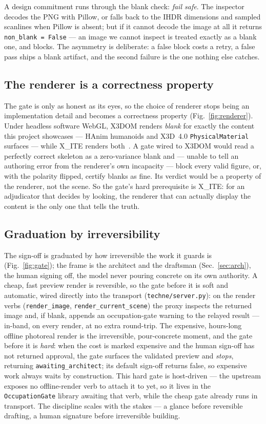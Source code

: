 \documentclass[sigconf,nonacm,screen,anonymous]{acmart}
\begin{document}
A design commitment runs through the blank check: \emph{fail safe}. The inspector decodes the PNG with Pillow, or falls back to the IHDR dimensions and sampled scanlines when Pillow is absent; but if it cannot decode the image at all it returns \texttt{non\_blank = False} --- an image we cannot inspect is treated exactly as a blank one, and blocks. The asymmetry is deliberate: a false block costs a retry, a false pass ships a blank artifact, and the second failure is the one nothing else catches.

\subsection{The renderer is a correctness property}

The gate is only as honest as its eyes, so the choice of renderer stops being an implementation detail and becomes a correctness property (Fig.~\ref{fig:renderer}). Under headless software WebGL, X3DOM renders \emph{blank} for exactly the content this project showcases --- HAnim humanoids and X3D~4.0 \texttt{PhysicalMaterial} surfaces --- while X\_ITE renders both~\cite{xite,x3dom,gltf,playwright}. A gate wired to X3DOM would read a perfectly correct skeleton as a zero-variance blank and --- unable to tell an authoring error from the renderer's own incapacity --- block every valid figure, or, with the polarity flipped, certify blanks as fine. Its verdict would be a property of the renderer, not the scene. So the gate's hard prerequisite is X\_ITE: for an adjudicator that decides by looking, the renderer that can actually display the content is the only one that tells the truth.

\subsection{Graduation by irreversibility}

The sign-off is graduated by how irreversible the work it guards is (Fig.~\ref{fig:gate}); the frame is the architect and the draftsman (Sec.~\ref{sec:arch}), the human signing off, the model never pouring concrete on its own authority. A cheap, fast preview render is reversible, so the gate before it is soft and automatic, wired directly into the transport (\texttt{techne/server.py}): on the render verbs (\texttt{render\_image}, \texttt{render\_current\_scene}) the proxy inspects the returned image and, if blank, appends an occupation-gate warning to the relayed result --- in-band, on every render, at no extra round-trip. The expensive, hours-long offline photoreal render is the irreversible, pour-concrete moment, and the gate before it is \emph{hard}: when the cost is marked expensive and the human sign-off has not returned approval, the gate surfaces the validated preview and \emph{stops}, returning \texttt{awaiting\_architect}; its default sign-off returns false, so expensive work always waits by construction. This hard gate is host-driven --- the upstream exposes no offline-render verb to attach it to yet, so it lives in the \texttt{OccupationGate} library awaiting that verb, while the cheap gate already runs in transport. The discipline scales with the stakes --- a glance before reversible drafting, a human signature before irreversible building.
\end{document}
